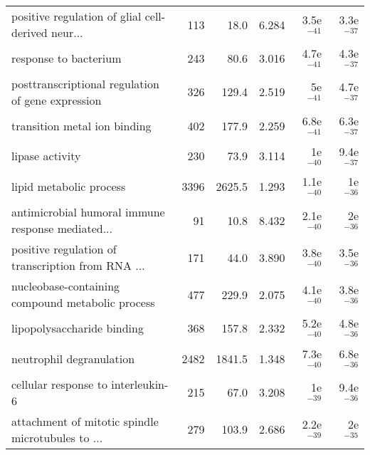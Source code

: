 \begin{longtable}{lrrrrr}
 positive regulation of glial cell-derived neur... &                     113 &                    18.0 &      6.284 &         3.5e$^{-41}$ &         3.3e$^{-37}$ \\
                             response to bacterium &                     243 &                    80.6 &      3.016 &         4.7e$^{-41}$ &         4.3e$^{-37}$ \\
 posttranscriptional regulation of gene expression &                     326 &                   129.4 &      2.519 &           5e$^{-41}$ &         4.7e$^{-37}$ \\
                      transition metal ion binding &                     402 &                   177.9 &      2.259 &         6.8e$^{-41}$ &         6.3e$^{-37}$ \\
                                   lipase activity &                     230 &                    73.9 &      3.114 &           1e$^{-40}$ &         9.4e$^{-37}$ \\
                           lipid metabolic process &                    3396 &                  2625.5 &      1.293 &         1.1e$^{-40}$ &           1e$^{-36}$ \\
 antimicrobial humoral immune response mediated... &                      91 &                    10.8 &      8.432 &         2.1e$^{-40}$ &           2e$^{-36}$ \\
 positive regulation of transcription from RNA ... &                     171 &                    44.0 &      3.890 &         3.8e$^{-40}$ &         3.5e$^{-36}$ \\
  nucleobase-containing compound metabolic process &                     477 &                   229.9 &      2.075 &         4.1e$^{-40}$ &         3.8e$^{-36}$ \\
                        lipopolysaccharide binding &                     368 &                   157.8 &      2.332 &         5.2e$^{-40}$ &         4.8e$^{-36}$ \\
                          neutrophil degranulation &                    2482 &                  1841.5 &      1.348 &         7.3e$^{-40}$ &         6.8e$^{-36}$ \\
                cellular response to interleukin-6 &                     215 &                    67.0 &      3.208 &           1e$^{-39}$ &         9.4e$^{-36}$ \\
 attachment of mitotic spindle microtubules to ... &                     279 &                   103.9 &      2.686 &         2.2e$^{-39}$ &           2e$^{-35}$ \\

\end{longtable}
